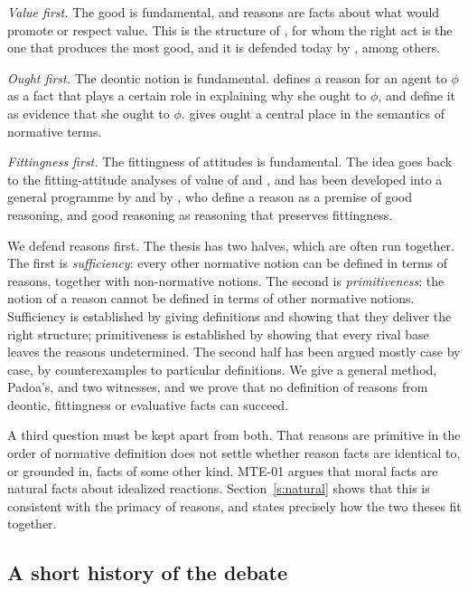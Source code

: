 \documentclass{situationist-preprint}
\begin{document}
\emph{Value first.} The good is fundamental, and reasons are facts about what would promote or respect value. This is the structure of \citet{Moore1903}, for whom the right act is the one that produces the most good, and it is defended today by \citet{Maguire2016}, among others.

\emph{Ought first.} The deontic notion is fundamental. \citet{Broome2004,Broome2013} defines a reason for an agent to $\phi$ as a fact that plays a certain role in explaining why she ought to $\phi$, and \citet{KearnsStar2009} define it as evidence that she ought to $\phi$. \citet{Wedgwood2007} gives ought a central place in the semantics of normative terms.

\emph{Fittingness first.} The fittingness of attitudes is fundamental. The idea goes back to the fitting-attitude analyses of value of \citet{Brentano1889} and \citet{Ewing1939}, and has been developed into a general programme by \citet{Chappell2012} and by \citet{McHughWay2016}, who define a reason as a premise of good reasoning, and good reasoning as reasoning that preserves fittingness.

We defend reasons first. The thesis has two halves, which are often run together. The first is \emph{sufficiency}: every other normative notion can be defined in terms of reasons, together with non-normative notions. The second is \emph{primitiveness}: the notion of a reason cannot be defined in terms of other normative notions. Sufficiency is established by giving definitions and showing that they deliver the right structure; primitiveness is established by showing that every rival base leaves the reasons undetermined. The second half has been argued mostly case by case, by counterexamples to particular definitions. We give a general method, Padoa's, and two witnesses, and we prove that no definition of reasons from deontic, fittingness or evaluative facts can succeed.

A third question must be kept apart from both. That reasons are primitive in the order of normative definition does not settle whether reason facts are identical to, or grounded in, facts of some other kind. MTE-01 argues that moral facts are natural facts about idealized reactions. Section~\ref{s:natural} shows that this is consistent with the primacy of reasons, and states precisely how the two theses fit together.

\subsection{A short history of the debate}
\end{document}
